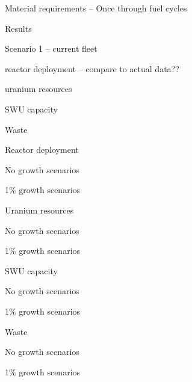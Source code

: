\documentclass{report}
\begin{document}
\begin{outline}
\item Material requirements -- Once through fuel cycles
\begin{outline}
    \item Results
    \begin{outline}
        \item Scenario 1 -- current fleet
        \begin{outline}
            \item reactor deployment -- compare to actual data??
            \item uranium resources
            \item SWU capacity
            \item Waste
        \end{outline}
        \item Reactor deployment
        \begin{outline}
            \item No growth scenarios
            \item 1\% growth scenarios
        \end{outline}
        \item Uranium resources
        \begin{outline}
            \item No growth scenarios
            \item 1\% growth scenarios
        \end{outline}
        \item SWU capacity
        \begin{outline}
            \item No growth scenarios
            \item 1\% growth scenarios
        \end{outline}
        \item Waste
        \begin{outline}
            \item No growth scenarios
            \item 1\% growth scenarios
        \end{outline}
    \end{outline}
\end{outline}


\end{outline}
\end{document}
